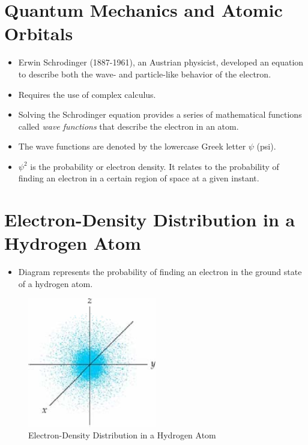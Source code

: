 \documentclass[
	chapter=7,
	title={Quantum Theory {\&} the Electronic Structure of Atoms},
	showanswers=true,
]{chem122notes}
\begin{document}
\section{Quantum Mechanics and Atomic Orbitals}\label{sec:quantum-mechanics-and-atomic-orbitals}
\begin{itemize}
	\item Erwin Schr{\:o}dinger (1887-1961), an Austrian physicist, developed an equation to describe both the wave- and particle-like behavior of the electron.
	\item Requires the use of complex calculus.
	\item Solving the Schr{\:o}dinger equation provides a series of mathematical functions called \emph{wave functions} that describe the electron in an atom.
	\item The wave functions are denoted by the lowercase Greek letter \emph{$\psi$} (psi).
	\item \emph{$\psi^{2}$} is the probability or electron density.
	It relates to the probability of finding an electron in a certain region of space at a given instant.
\end{itemize}

\section{Electron-Density Distribution in a Hydrogen Atom}\label{sec:electron-density-distribution-in-a-hydrogen-atom}
\begin{itemize}
	\item Diagram represents the probability of finding an electron in the ground state of a hydrogen atom.
\end{itemize}
\begin{figure}[H]
	\centering
	\includegraphics[width=0.5\textwidth]{chapter7/electron_density_distribution}
	\caption{Electron-Density Distribution in a Hydrogen Atom}
	\label{fig:electron-density-distribution}
\end{figure}
\end{document}
